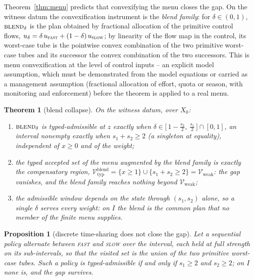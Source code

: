 \documentclass[preprint,11pt,authoryear]{elsarticle}
\newtheorem{theorem}{Theorem}
\newtheorem{proposition}{Proposition}
\theoremstyle{definition}
\theoremstyle{remark}
\newcommand{\Vtyp}{\mathcal{V}_{\mathrm{typ}}}
\newcommand{\Vweak}{\mathcal{V}_{\mathrm{weak}}}
\newcommand{\act}[1]{\textsc{#1}}
\begin{document}
Theorem~\ref{thm:menu} predicts that convexifying the menu closes the gap. On the witness datum the convexification instrument is the \emph{blend family}: for $\delta\in(0,1)$, $\act{blend}_\delta$ is the plan obtained by fractional allocation of the primitive control flows, $u_\delta=\delta\,u_{\act{fast}}+(1-\delta)\,u_{\act{slow}}$; by linearity of the flow map in the control, its worst-case tube is the pointwise convex combination of the two primitive worst-case tubes and its successor the convex combination of the two successors. This is menu convexification at the level of control inputs -- an explicit model assumption, which must be demonstrated from the model equations or carried as a management assumption (fractional allocation of effort, quota or season, with monitoring and enforcement) before the theorem is applied to a real menu.

\begin{theorem}[blend collapse]\label{thm:blend}
On the witness datum, over $X_0$:
\begin{enumerate}[label=\textup{(\roman*)},leftmargin=2em]
\item $\act{blend}_\delta$ is typed-admissible at $z$ exactly when $\delta\in\big[\,1-\tfrac{s_2}2,\ \tfrac{s_1}2\,\big]\cap[0,1]$, an interval nonempty exactly when $s_1+s_2\ge2$ (a singleton at equality), independent of $x\ge0$ and of the weight;
\item the typed accepted set of the menu augmented by the blend family is exactly the compensatory region,
$\Vtyp^{\mathrm{blend}}=\{x\ge1\}\cup\{s_1+s_2\ge2\}=\Vweak$: the gap vanishes, and the blend family reaches nothing beyond $\Vweak$;
\item the admissible window depends on the state through $(s_1,s_2)$ alone, so a single $\delta$ serves every weight: on $I$ the blend is the common plan that no member of the finite menu supplies.
\end{enumerate}
\end{theorem}

\begin{proposition}[discrete time-sharing does not close the gap]\label{prop:timeshare}
Let a sequential policy alternate between \act{fast} and \act{slow} over the interval, each held at full strength on its sub-intervals, so that the visited set is the union of the two primitive worst-case tubes. Such a policy is typed-admissible if and only if $s_1\ge2$ and $s_2\ge2$; on $I$ none is, and the gap survives.
\end{proposition}
\end{document}
